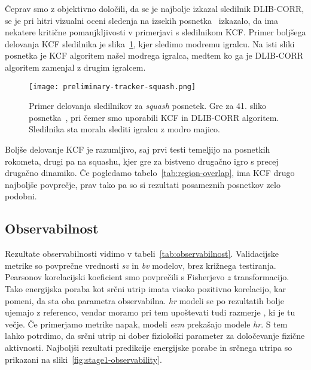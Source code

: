 Čeprav smo z objektivno določili, da se je najbolje izkazal sledilnik DLIB-CORR, se je pri hitri vizualni oceni sledenja na izsekih posnetka~\cite{squashtv2014squash} izkazalo, da ima nekatere kritične pomanjkljivosti v primerjavi s sledilnikom KCF. Primer boljšega delovanja KCF sledilnika je slika~\ref{fig:squash-tracker-visual}, kjer sledimo modremu igralcu. Na isti sliki posnetka je KCF algoritem našel modrega igralca, medtem ko ga je DLIB-CORR algoritem zamenjal z drugim igralcem. 



\begin{figure}[!htbp]
	\centering
	\texttt{[image: preliminary-tracker-squash.png]}
	\caption[Primer delovanja sledilnikov za \textit{squash} posnetek]{Primer delovanja sledilnikov za \textit{squash} posnetek. Gre za 41. sliko posnetka~\cite{squashtv2014squash}, pri čemer smo uporabili KCF in DLIB-CORR algoritem. Sledilnika sta morala slediti igralcu z modro majico.}
	\label{fig:squash-tracker-visual}
\end{figure}


Boljše delovanje KCF je razumljivo, saj prvi testi temeljijo na posnetkih rokometa, drugi pa na squashu, kjer gre za bistveno drugačno igro s precej drugačno dinamiko. Če pogledamo tabelo~\ref{tab:region-overlap}, ima KCF drugo najboljše povprečje, prav tako pa so si rezultati posameznih posnetkov zelo podobni. 


















\subsection{Observabilnost}
Rezultate observabilnosti vidimo v tabeli~\ref{tab:observabilnost}. Validacijske metrike so povprečne vrednosti \textit{sv} in \textit{bv} modelov, brez križnega testiranja.  Pearsonov korelacijski koeficient smo povprečili s Fisherjevo $z$ transformacijo. Tako energijska poraba kot srčni utrip imata visoko pozitivno korelacijo, kar pomeni, da sta oba parametra observabilna. \textit{hr} modeli se po \corr rezultatih bolje ujemajo z referenco, vendar moramo pri tem upoštevati tudi razmerje \nsv, ki je tu večje. Če primerjamo metrike napak, modeli \textit{eem} prekašajo modele \textit{hr}. S tem lahko potrdimo, da srčni utrip ni dober fiziološki parameter za določevanje fizične aktivnosti. Najboljši rezultati predikcije energijske porabe in srčnega utripa so prikazani na sliki~\ref{fig:stage1-observability}.

